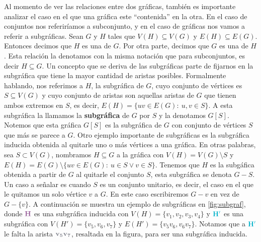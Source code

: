 Al momento de ver las relaciones entre dos gr\'aficas, tambi\'en es importante
analizar el caso en el que una gr\'afica este ``contenida'' en la otra. En el
caso de conjuntos nos referir\'iamos a subconjunto, y en el caso de gr\'aficas
nos vamos a referir a subgr\'aficas. Sean $G$ y $H$ tales que $V(H) \subseteq
V(G)$ y $E(H) \subseteq E(G)$. Entonces decimos que $H$ es una
 de $G$. Por otra parte, decimos que $G$ es una
 de $H$. Esta relaci\'on la denotamos con la misma
notaci\'on que para subconjuntos, es decir $H \subseteq G$. Un concepto que se
deriva de las subgr\'aficas parte de fijarnos en la subgr\'afica que tiene la
mayor cantidad de aristas posibles. Formalmente hablando, nos referimos a $H$,
la subgr\'afica de $G$, cuyo conjunto de v\'ertices es $S \subseteq V(G)$ y cuyo
conjunto de aristas son aquellas aristas de $G$ que tienen ambos extremos en
$S$, es decir, $E(H) = \{uv \in E(G) \colon\ u,v \in S\}$. A esta subgr\'afica
la llamamos la \textbf{subgr\'afica}  de $G$
por $S$ y la denotamos $G[S]$. Notemos que esta gr\'afica $G[S]$ es la
subgr\'afica de $G$ con conjunto de v\'ertices $S$ que m\'as se parece a $G$.
Otro ejemplo importante de subgr\'aficas es la subgr\'afica inducida obtenida al
quitarle uno o m\'as v\'ertices a una gr\'afica. En otras palabras, sea $S
\subset V(G)$, nombramos $H \subseteq G$ a la gr\'afica con $V(H)=V(G) \setminus
S$ y $E(H) = E(G)\setminus\{uv \in E(G) \colon\ u \in S \lor v \in S\}$. Tenemos
que $H$ es la subg\'afica obtenida a partir de $G$ al quitarle el conjunto $S$,
esta subgr\'afica se denota $G-S$. Un caso a se\~{n}alar es cuando $S$ es un
conjunto unitario, es decir, el caso en el que le quitamos un solo v\'ertice $v$
a $G$. En este caso escribiremos $G-v$ en vez de $G-\{v\}$. A continuaci\'on se
muestra un ejemplo de subgr\'aficas en \cref{fig:subgraf}, donde
${\color{morado}\bf H}$ es una subgr\'afica inducida con $V(H) =
\{v_1,v_2,v_3,v_4\}$ y ${\color{azulCielo}\bf H'}$ es una subgr\'afica con
$V(H')=\{v_5,v_6,v_7\}$ y $E(H')=\{v_5v_6,  v_6v_7\}$. Notamos que a
${\color{azulCielo}\bf H'}$ le falta la arista ${\color{grisOscuro!80}\bf
v_5v_7}$, resaltada en la figura, para ser una subgr\'afica inducida. 

